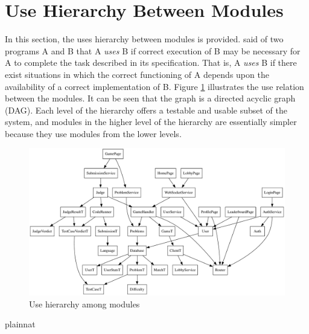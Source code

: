 \documentclass[12pt, titlepage]{article}
\begin{document}
\section{Use Hierarchy Between Modules} \label{SecUse}

In this section, the uses hierarchy between modules is
provided. \citet{Parnas1978} said of two programs A and B that A {\em uses} B if
correct execution of B may be necessary for A to complete the task described in
its specification. That is, A {\em uses} B if there exist situations in which
the correct functioning of A depends upon the availability of a correct
implementation of B.  Figure \ref{FigUH} illustrates the use relation between
the modules. It can be seen that the graph is a directed acyclic graph
(DAG). Each level of the hierarchy offers a testable and usable subset of the
system, and modules in the higher level of the hierarchy are essentially simpler
because they use modules from the lower levels.

\begin{figure}[H]
\centering
\includegraphics[width=1\textwidth]{UseHierarchy.pdf}
\caption{Use hierarchy among modules}

\label{FigUH}
\end{figure}


 {plainnat}


\newpage{}
\end{document}
